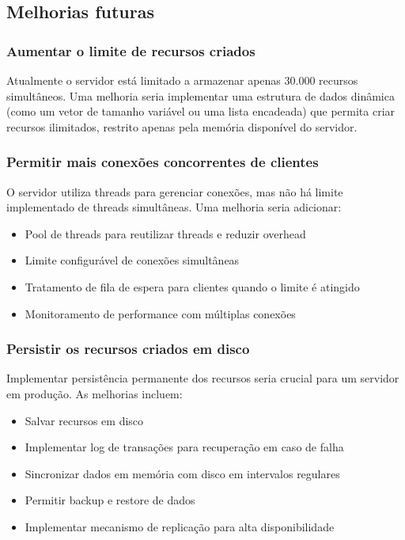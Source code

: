 \documentclass{article}
\begin{document}
\subsection{Melhorias futuras}

\subsubsection{Aumentar o limite de recursos criados}

Atualmente o servidor está limitado a armazenar apenas 30.000 recursos simultâneos. Uma melhoria seria implementar uma estrutura de dados dinâmica (como um vetor de tamanho variável ou uma lista encadeada) que permita criar recursos ilimitados, restrito apenas pela memória disponível do servidor.

\subsubsection{Permitir mais conexões concorrentes de clientes}

O servidor utiliza threads para gerenciar conexões, mas não há limite implementado de threads simultâneas. Uma melhoria seria adicionar:
\begin{itemize}
    \item Pool de threads para reutilizar threads e reduzir overhead
    \item Limite configurável de conexões simultâneas
    \item Tratamento de fila de espera para clientes quando o limite é atingido
    \item Monitoramento de performance com múltiplas conexões
\end{itemize}

\subsubsection{Persistir os recursos criados em disco}

Implementar persistência permanente dos recursos seria crucial para um servidor em produção. As melhorias incluem:
\begin{itemize}
    \item Salvar recursos em disco
    \item Implementar log de transações para recuperação em caso de falha
    \item Sincronizar dados em memória com disco em intervalos regulares
    \item Permitir backup e restore de dados
    \item Implementar mecanismo de replicação para alta disponibilidade
\end{itemize}
\end{document}
